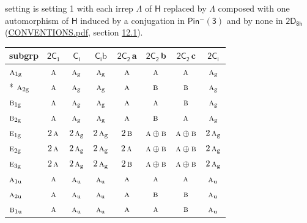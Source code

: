 \documentclass[10pt,a4paper]{article}
\numberwithin{equation}{section}
\newcommand{\grp}[1]{\mathsf{#1}}
\newcommand{\irr}[1]{\text{\normalfont\scshape #1}}
\newcommand{\ptag}[1]{\mathrm{#1}}
\newcommand{\clsletter}[1]{\,{\scriptsize\color{black!55}#1}}
\newcommand{\secondclass}{\mathrm{b}}
\begin{document}
setting is setting 1 with each irrep $\Lambda$ of $\grp{H}$ replaced by $\Lambda$ composed with one automorphism of $\grp{H}$ induced by a conjugation in \href{Pinminus3.pdf}{$\grp{Pin^{-}(3)}$} and by none in $\grp{2D_{8h}}$ (\href{../../CONVENTIONS.pdf}{CONVENTIONS.pdf}, section \href{../../../rotation/CONVENTIONS.pdf\#conv.12.1}{12.1}).
{\small\begin{longtable}{@{}lccccccc@{}}\toprule
subgrp & \href{2C1.pdf}{$\grp{2C_{1}}$} & \href{S2.pdf}{$\grp{C_{i}}$} & \href{S2b.pdf}{$\grp{C_{i}}\secondclass$} & \href{2C2.pdf}{$\grp{2C_{2}}$}\clsletter{a} & \href{2C2.pdf}{$\grp{2C_{2}}$}\clsletter{b} & \href{2C2.pdf}{$\grp{2C_{2}}$}\clsletter{c} & \href{2S2.pdf}{$\grp{2C_{i}}$}\\\midrule\endhead
\bottomrule\endfoot\endlastfoot
$\irr{a}_{1\ptag{g}}$ & $\irr{a}$ & $\irr{a}_{\ptag{g}}$ & $\irr{a}_{\ptag{g}}$ & $\irr{a}$ & $\irr{a}$ & $\irr{a}$ & $\irr{a}_{\ptag{g}}$\\*
$\irr{a}_{2\ptag{g}}$ & $\irr{a}$ & $\irr{a}_{\ptag{g}}$ & $\irr{a}_{\ptag{g}}$ & $\irr{a}$ & $\irr{b}$ & $\irr{b}$ & $\irr{a}_{\ptag{g}}$\\
$\irr{b}_{1\ptag{g}}$ & $\irr{a}$ & $\irr{a}_{\ptag{g}}$ & $\irr{a}_{\ptag{g}}$ & $\irr{a}$ & $\irr{a}$ & $\irr{b}$ & $\irr{a}_{\ptag{g}}$\\
$\irr{b}_{2\ptag{g}}$ & $\irr{a}$ & $\irr{a}_{\ptag{g}}$ & $\irr{a}_{\ptag{g}}$ & $\irr{a}$ & $\irr{b}$ & $\irr{a}$ & $\irr{a}_{\ptag{g}}$\\
$\irr{e}_{1\ptag{g}}$ & $2\,\irr{a}$ & $2\,\irr{a}_{\ptag{g}}$ & $2\,\irr{a}_{\ptag{g}}$ & $2\,\irr{b}$ & $\irr{a}\oplus \irr{b}$ & $\irr{a}\oplus \irr{b}$ & $2\,\irr{a}_{\ptag{g}}$\\
$\irr{e}_{2\ptag{g}}$ & $2\,\irr{a}$ & $2\,\irr{a}_{\ptag{g}}$ & $2\,\irr{a}_{\ptag{g}}$ & $2\,\irr{a}$ & $\irr{a}\oplus \irr{b}$ & $\irr{a}\oplus \irr{b}$ & $2\,\irr{a}_{\ptag{g}}$\\
$\irr{e}_{3\ptag{g}}$ & $2\,\irr{a}$ & $2\,\irr{a}_{\ptag{g}}$ & $2\,\irr{a}_{\ptag{g}}$ & $2\,\irr{b}$ & $\irr{a}\oplus \irr{b}$ & $\irr{a}\oplus \irr{b}$ & $2\,\irr{a}_{\ptag{g}}$\\
$\irr{a}_{1\ptag{u}}$ & $\irr{a}$ & $\irr{a}_{\ptag{u}}$ & $\irr{a}_{\ptag{u}}$ & $\irr{a}$ & $\irr{a}$ & $\irr{a}$ & $\irr{a}_{\ptag{u}}$\\
$\irr{a}_{2\ptag{u}}$ & $\irr{a}$ & $\irr{a}_{\ptag{u}}$ & $\irr{a}_{\ptag{u}}$ & $\irr{a}$ & $\irr{b}$ & $\irr{b}$ & $\irr{a}_{\ptag{u}}$\\
$\irr{b}_{1\ptag{u}}$ & $\irr{a}$ & $\irr{a}_{\ptag{u}}$ & $\irr{a}_{\ptag{u}}$ & $\irr{a}$ & $\irr{a}$ & $\irr{b}$ & $\irr{a}_{\ptag{u}}$\\

\end{longtable}}
\end{document}
